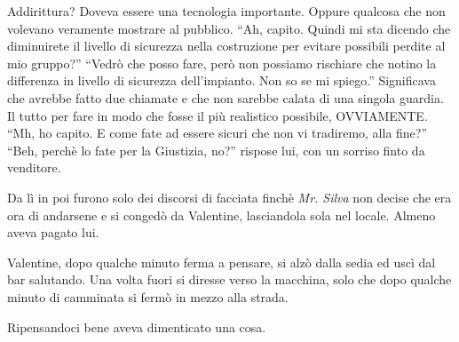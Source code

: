     Addirittura? Doveva essere una tecnologia importante. Oppure qualcosa che non volevano veramente mostrare al
    pubblico. ``Ah, capito. Quindi mi sta dicendo che diminuirete il livello di sicurezza nella costruzione per evitare
    possibili perdite al mio gruppo?'' ``Vedrò che posso fare, però non possiamo rischiare che notino la differenza in
    livello di sicurezza dell'impianto. Non so se mi spiego.'' Significava che avrebbe fatto due chiamate e che non
    sarebbe calata di una singola guardia. Il tutto per fare in modo che fosse il più realistico possibile, OVVIAMENTE.
    ``Mh, ho capito. E come fate ad essere sicuri che non vi tradiremo, alla fine?'' ``Beh, perchè lo fate per la
    Giustizia, no?'' rispose lui, con un sorriso finto da venditore.

    Da lì in poi furono solo dei discorsi di facciata finchè \emph{Mr. Silva} non decise che era ora di andarsene e si
    congedò da Valentine, lasciandola sola nel locale. Almeno aveva pagato lui.

    Valentine, dopo qualche minuto ferma a pensare, si alzò dalla sedia ed uscì dal bar salutando. Una volta fuori si
    diresse verso la macchina, solo che dopo qualche minuto di camminata si fermò in mezzo alla strada.

    Ripensandoci bene aveva dimenticato una cosa.
